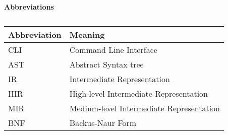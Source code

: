\textbf{Abbreviations}\\
\begin{table}[H]
  \caption{}
  \label{tab:}
  \begin{tabular}{|p{5cm}|p{5cm}|}
    \hline
    Abbreviation & Meaning\\
    \hline
    CLI & Command Line Interface\\
    \hline
    AST & Abstract Syntax tree\\
    \hline
    IR & Intermediate Representation\\
    \hline
    HIR & High-level Intermediate Representation \\
    \hline
    MIR & Medium-level Intermediate Representation \\
    \hline
    BNF & Backus-Naur Form \\
    \hline
  \end{tabular}
\end{table}

\newpage
